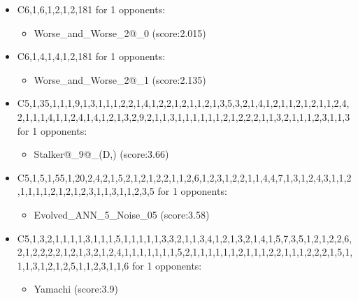 \begin{appendices}
\begin{itemize}
        \item C6,1,6,1,2,1,2,181 for 1 opponents:
        \begin{multicols}{3}
            \begin{itemize}
                \item Worse\_and\_Worse\_2@\_0 (score:2.015)
            \end{itemize}
        \end{multicols}

        \item C6,1,4,1,4,1,2,181 for 1 opponents:
        \begin{multicols}{3}
            \begin{itemize}
                \item Worse\_and\_Worse\_2@\_1 (score:2.135)
            \end{itemize}
        \end{multicols}

        \item C5,1,35,1,1,1,9,1,3,1,1,1,2,2,1,4,1,2,2,1,2,1,1,2,1,3,5,3,2,1,4,1,2,1,1,2,1,2,1,1,2,4,2,1,1,1,4,1,1,2,4,1,4,1,2,1,3,2,9,2,1,1,3,1,1,1,1,1,1,2,1,2,2,2,1,1,3,2,1,1,1,2,3,1,1,3 for 1 opponents:
        \begin{multicols}{3}
            \begin{itemize}
                \item Stalker@\_9@\_(D,) (score:3.66)
            \end{itemize}
        \end{multicols}

        \item C5,1,5,1,55,1,20,2,4,2,1,5,2,1,2,1,2,2,1,1,2,6,1,2,3,1,2,2,1,1,4,4,7,1,3,1,2,4,3,1,1,2,1,1,1,1,2,1,2,1,2,3,1,1,3,1,1,2,3,5 for 1 opponents:
        \begin{multicols}{3}
            \begin{itemize}
                \item Evolved\_ANN\_5\_Noise\_05 (score:3.58)
            \end{itemize}
        \end{multicols}

        \item C5,1,3,2,1,1,1,1,3,1,1,1,5,1,1,1,1,1,3,3,2,1,1,3,4,1,2,1,3,2,1,4,1,5,7,3,5,1,2,1,2,2,6,2,1,2,2,2,2,1,2,1,3,2,1,2,4,1,1,1,1,1,1,1,5,2,1,1,1,1,1,1,2,1,1,1,2,2,1,1,1,2,2,2,1,5,1,1,1,3,1,2,1,2,5,1,1,2,3,1,1,6 for 1 opponents:
        \begin{multicols}{3}
            \begin{itemize}
                \item Yamachi (score:3.9)
            \end{itemize}
        \end{multicols}


\end{itemize}
\end{appendices}
